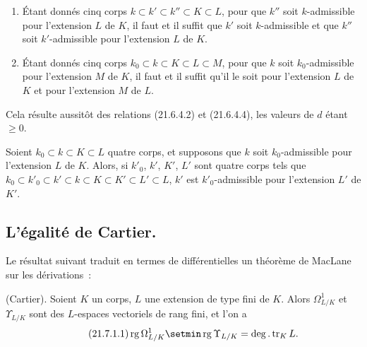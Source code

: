 \begin{corollary}[21.6.5]
\label{0.21.6.5-fr}
\begin{enumerate}
  \item[\textup{(i)}] Étant donnés cinq corps $k\subset k'\subset k''\subset K\subset L$,
  pour que $k''$ soit $k$-admissible pour l'extension $L$ de $K$, il faut et
  il suffit que $k'$ soit $k$-admissible et que $k''$ soit $k'$-admissible
  pour l'extension $L$ de $K$.
  \item[\textup{(ii)}] Étant donnés cinq corps
  $k_0\subset k\subset K\subset L\subset M$, pour que $k$ soit
  $k_0$-admissible pour l'extension $M$ de $K$, il faut et il suffit qu'il le
  soit pour l'extension $L$ de $K$ et pour l'extension $M$ de $L$.
\end{enumerate}
\end{corollary}

Cela résulte aussitôt des relations (21.6.4.2) et (21.6.4.4), les valeurs de
$d$ étant $\geqslant0$.

\begin{corollary}[21.6.6]
\label{0.21.6.6-fr}
Soient $k_0\subset k\subset K\subset L$ quatre corps, et supposons que $k$
soit $k_0$-admissible pour l'extension $L$ de $K$. Alors, si $k'_0$, $k'$,
$K'$, $L'$ sont quatre corps tels que
$k_0\subset k'_0\subset k'\subset k\subset K\subset K'\subset L'\subset L$,
$k'$ est $k'_0$-admissible pour l'extension $L'$ de $K'$.
\end{corollary}

\subsection{L'égalité de Cartier.}
\label{subsection:0.21.7-fr}

Le résultat suivant traduit en termes de différentielles un théorème de
MacLane sur les dérivations~:

\begin{theorem}[21.7.1]
\label{0.21.7.1-fr}
\textnormal{(Cartier).}
Soient $K$ un corps, $L$ une extension de type fini de $K$. Alors
$\Omega^1_{L/K}$ et $\Upsilon_{L/K}$ sont des $L$-espaces vectoriels de rang
fini, et l'on a
\begin{equation}
\tag{21.7.1.1}
\label{0.21.7.1.1-fr}
\operatorname{rg}\Omega^1_{L/K}\setmin\operatorname{rg}\Upsilon_{L/K}
=\deg.\operatorname{tr}_K L.
\end{equation}
\end{theorem}


